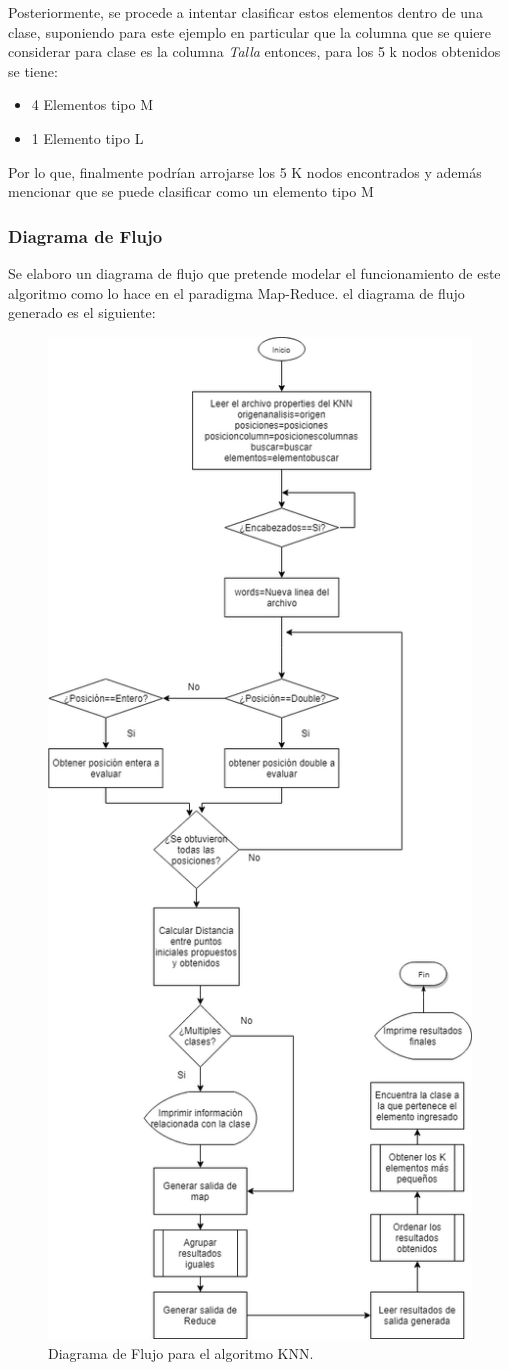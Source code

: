 Posteriormente, se procede a intentar clasificar estos elementos dentro de una clase, suponiendo para este ejemplo en particular que la columna que se quiere considerar para clase es la columna \emph{Talla} entonces, para los 5 k nodos obtenidos se tiene:
\begin{itemize}
	\item 4 Elementos tipo M
	\item 1 Elemento tipo L 
\end{itemize}
Por lo que, finalmente podrían arrojarse los 5 K nodos encontrados y además mencionar que se puede clasificar como un elemento tipo M
\newpage
\subsubsection{Diagrama de Flujo}
Se elaboro un diagrama de flujo que pretende modelar el funcionamiento de este algoritmo como lo hace en el paradigma Map-Reduce. 
el diagrama de flujo generado es el siguiente:
	\begin{figure}[H]
		\begin{center}
			\hypertarget{fig:diagramaflujo}{\hspace{1pt}}
			\includegraphics[width=.5\textwidth]{capitulo4a/images/KNN.png}
			\caption{Diagrama de Flujo para el algoritmo KNN.}
			\label{fig:diagramaflujo}
		\end{center}
	\end{figure}
